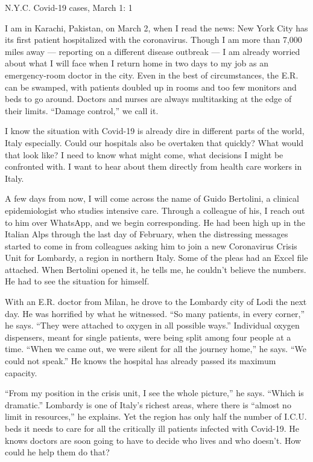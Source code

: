 N.Y.C. Covid-19 cases, March 1: 1

I am in Karachi, Pakistan, on March 2, when I read the news: New York
City has its first patient hospitalized with the coronavirus. Though I
am more than 7,000 miles away --- reporting on a different disease
outbreak --- I am already worried about what I will face when I return
home in two days to my job as an emergency-room doctor in the city. Even
in the best of circumstances, the E.R. can be swamped, with patients
doubled up in rooms and too few monitors and beds to go around. Doctors
and nurses are always multitasking at the edge of their limits. ``Damage
control,'' we call it.

I know the situation with ­Covid-19 is already dire in different parts
of the world, Italy especially. Could our hospitals also be overtaken
that quickly? What would that look like? I need to know what might come,
what decisions I might be confronted with. I want to hear about them
directly from health care workers in Italy.

A few days from now, I will come across the name of Guido Bertolini, a
clinical epidemiologist who studies intensive care. Through a colleague
of his, I reach out to him over Whats­App, and we begin corresponding.
He had been high up in the Italian Alps through the last day of
February, when the distressing messages started to come in from
colleagues asking him to join a new Coronavirus Crisis Unit for
Lombardy, a region in northern Italy. Some of the pleas had an Excel
file attached. When Bertolini opened it, he tells me, he couldn't
believe the numbers. He had to see the situation for himself.

With an E.R. doctor from Milan, he drove to the Lombardy city of Lodi
the next day. He was horrified by what he witnessed. ``So many patients,
in every corner,'' he says. ``They were attached to oxygen in all
possible ways.'' Individual oxygen dispensers, meant for single
patients, were being split among four people at a time. ``When we came
out, we were silent for all the journey home,'' he says. ``We could not
speak.'' He knows the hospital has already passed its maximum capacity.

``From my position in the crisis unit, I see the whole picture,'' he
says. ``Which is dramatic.'' Lombardy is one of Italy's richest areas,
where there is ``almost no limit in resources,'' he explains. Yet the
region has only half the number of I.C.U. beds it needs to care for all
the critically ill patients infected with ­Covid-19. He knows doctors
are soon going to have to decide who lives and who doesn't. How could he
help them do that?

